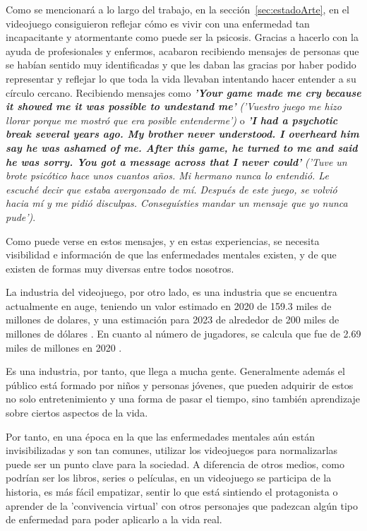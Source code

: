 \documentclass[12pt, a4paper,twoside,titlepage]{book}
\begin{document}
Como se mencionará a lo largo del trabajo, en la sección~\ref{sec:estadoArte}, en el videojuego  consiguieron reflejar cómo es vivir con una enfermedad tan incapacitante y atormentante como puede ser la psicosis. Gracias a hacerlo con la ayuda de profesionales y enfermos, acabaron recibiendo mensajes de personas que se habían sentido muy identificadas y que les daban las gracias por haber podido representar y reflejar lo que toda la vida llevaban intentando hacer entender a su círculo cercano. Recibiendo mensajes como \textbf{\textit{'Your game made me cry because it showed me it was possible to undestand me'}} \textit{('Vuestro juego me hizo llorar porque me mostró que era posible entenderme')} o \textbf{\textit{'I had a psychotic break several years ago. My brother never understood. I overheard him say he was ashamed of me. After this game, he turned to me and said he was sorry. You got a message across that I never could'}} \textit{('Tuve un brote psicótico hace unos cuantos años. Mi hermano nunca lo entendió. Le escuché decir que estaba avergonzado de mí. Después de este juego, se volvió hacia mí y me pidió disculpas. Conseguísties mandar un mensaje que yo nunca pude')}. 

Como puede verse en estos mensajes, y en estas experiencias, se necesita visibilidad e información de que las enfermedades mentales existen, y de que existen de formas muy diversas entre todos nosotros. 

La industria del videojuego, por otro lado, es una industria que se encuentra actualmente en auge, teniendo un valor estimado en 2020 de 159.3 miles de millones de dolares, y una estimación para 2023 de alrededor de 200 miles de millones de dólares \cite{articuloIntroVideojuegos}. En cuanto al número de jugadores, se calcula que fue de 2.69 miles de millones en 2020 \cite{articuloIntroVideojuegos2}. 

Es una industria, por tanto, que llega a mucha gente. Generalmente además el público está formado por niños y personas jóvenes, que pueden adquirir de estos no solo entretenimiento y una forma de pasar el tiempo, sino también aprendizaje sobre ciertos aspectos de la vida. 

Por tanto, en una época en la que las enfermedades mentales aún están invisibilizadas y son tan comunes, utilizar los videojuegos para normalizarlas puede ser un punto clave para la sociedad. A diferencia de otros medios, como podrían ser los libros, series o películas, en un videojuego se participa de la historia, es más fácil empatizar, sentir lo que está sintiendo el protagonista o aprender de la 'convivencia virtual' con otros personajes que padezcan algún tipo de enfermedad para poder aplicarlo a la vida real. 
\end{document}
